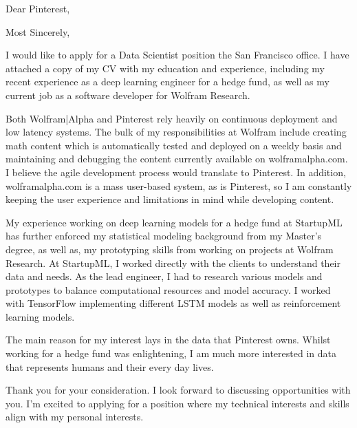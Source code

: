 \documentclass[11pt,a4paper,unicode]{moderncv}
\begin{document}
\vspace*{-6mm}

\vspace*{-6mm}



\date{\today} %


\opening{{Dear Pinterest},} %
\closing{Most Sincerely,} %

\makelettertitle %
	I would like to apply for a Data Scientist position the San Francisco office. I have attached a copy of my CV with my education and experience, including my recent experience as a deep learning engineer for a hedge fund, as well as my current job as a software developer for Wolfram Research. 
			
\vspace{3mm}  
	Both Wolfram|Alpha and Pinterest rely heavily on continuous deployment and low latency systems. The bulk of my responsibilities at Wolfram include creating math content which is automatically tested and deployed on a weekly basis and maintaining and debugging the content currently available on wolframalpha.com. I believe the agile development process would translate to Pinterest. In addition, wolframalpha.com is a mass user-based system, as is Pinterest, so I am constantly keeping the user experience and limitations in mind while developing content. 
	
\vspace{3mm}  
	My experience working on deep learning models for a hedge fund at StartupML has further enforced my statistical modeling background from my Master's degree, as well as, my prototyping skills from working on projects at Wolfram Research. At StartupML, I worked directly with the clients to understand their data and needs. As the lead engineer, I had to research various models and prototypes to balance computational resources and model accuracy. I worked with TensorFlow implementing different LSTM models as well as reinforcement learning models. 
	

\vspace{3mm}	
	The main reason for my interest lays in the data that Pinterest owns. Whilst working for a hedge fund was enlightening, I am much more interested in data that represents humans and their every day lives.
	
\vspace{3mm}  
	Thank you for your consideration. I look forward to discussing opportunities with you. I'm excited to applying for a position where my technical interests and skills align with my personal interests. 

\makeletterclosing %
\end{document}

